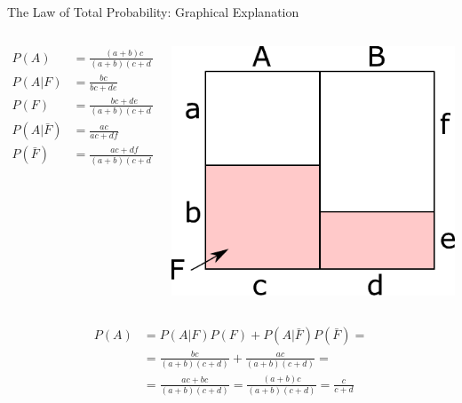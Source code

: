 \begin{frame}{The Law of Total Probability: Graphical Explanation}
    \begin{columns}
        \begin{column}{0.6\textwidth}
            {\small
            \begin{align*}
            P(A) &= \frac{(a+b)c}{(a+b)(c+d)} = \frac{c}{c+d} \\
            P(A|F) &= \frac{bc}{bc+de} \\
            P(F) &= \frac{bc+de}{(a+b)(c+d)} \\
            P(A|\bar{F}) &= \frac{ac}{ac+df} \\
            P(\bar{F}) &= \frac{ac+df}{(a+b)(c+d)}
            \end{align*}
            }
        \end{column}
        \begin{column}{0.4\textwidth}
            \includegraphics[width=\linewidth]{gfx/total_probability}
        \end{column}
    \end{columns}
    {\small
    \begin{align*}
    P(A)    &= P(A|F)P(F) + P(A|\bar{F})P(\bar{F}) = \\
            &= \frac{bc}{(a+b)(c+d)} + \frac{ac}{(a+b)(c+d)} = \\
            &= \frac{ac+bc}{(a+b)(c+d)} = \frac{(a+b)c}{(a+b)(c+d)} = \frac{c}{c+d}
    \end{align*}}
\end{frame}

